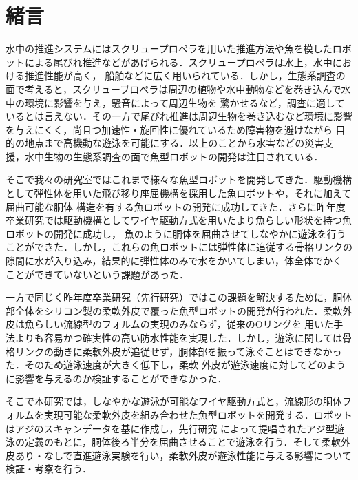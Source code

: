 \newpage
\setcounter{page}{1}
\section{緒言}
水中の推進システムにはスクリュープロペラを用いた推進方法や魚を模したロボットによる尾びれ推進などがあげられる\cite{ichi}．スクリュープロペラは水上，水中における推進性能が高く，
船舶などに広く用いられている．しかし，生態系調査の面で考えると，スクリュープロペラは周辺の植物や水中動物などを巻き込んで水中の環境に影響を与え，騒音によって周辺生物を
驚かせるなど，調査に適しているとは言えない．その一方で尾びれ推進は周辺生物を巻き込むなど環境に影響を与えにくく，尚且つ加速性・旋回性に優れているため障害物を避けながら
目的の地点まで高機動な遊泳を可能にする．以上のことから水害などの災害支援，水中生物の生態系調査の面で魚型ロボットの開発は注目されている\cite{ni}\cite{san}．

そこで我々の研究室ではこれまで様々な魚型ロボットを開発してきた．駆動機構として弾性体を用いた飛び移り座屈機構を採用した魚ロボット\cite{yon}\cite{go}や，それに加えて屈曲可能な胴体
構造を有する魚ロボット\cite{roku,nana,hachi}の開発に成功してきた．さらに昨年度卒業研究では駆動機構としてワイヤ駆動方式を用いたより魚らしい形状を持つ魚ロボットの開発に成功し，
魚のように胴体を屈曲させてしなやかに遊泳を行うことができた．しかし，これらの魚ロボットには弾性体に追従する骨格リンクの隙間に水が入り込み，結果的に弾性体のみで水をかいてしまい，体全体でかく
ことができていないという課題があった．

一方で同じく昨年度卒業研究（先行研究\cite{kyu}）ではこの課題を解決するために，胴体部全体をシリコン製の柔軟外皮で覆った魚型ロボットの開発が行われた．柔軟外皮は魚らしい流線型のフォルムの実現のみならず，従来のOリングを
用いた手法よりも容易かつ確実性の高い防水性能を実現した．しかし，遊泳に関しては骨格リンクの動きに柔軟外皮が追従せず，胴体部を振って泳ぐことはできなかった．そのため遊泳速度が大きく低下し，柔軟
外皮が遊泳速度に対してどのように影響を与えるのか検証することができなかった．

そこで本研究では，しなやかな遊泳が可能なワイヤ駆動方式と，流線形の胴体フォルムを実現可能な柔軟外皮を組み合わせた魚型ロボットを開発する．ロボットはアジのスキャンデータを基に作成し，先行研究
\cite{juu}によって提唱されたアジ型遊泳の定義のもとに，胴体後ろ半分を屈曲させることで遊泳を行う．そして柔軟外皮あり・なしで直進遊泳実験を行い，柔軟外皮が遊泳性能に与える影響について検証・考察を行う．
